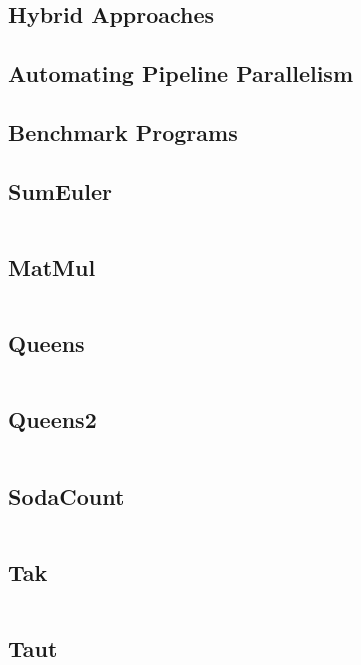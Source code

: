 \documentclass[openright, dottedtoc, headinclude, footinclude=true, a4paper, numbers=noenddot]{scrreprt}
\begin{document}
        \section{Hybrid Approaches}
        \label{sec:hybrid}
        
    
        \section{Automating Pipeline Parallelism}
        \label{sec:autoPipe}
        
    
    

\begin{appendices}

\chapter{Benchmark Programs}

    \section{SumEuler}
    \inputminted{haskell}{benchmarks/SumEuler.hs}
    \clearpage

    \section{MatMul}
    \inputminted{haskell}{benchmarks/MatMul.hs}
    \clearpage

    \section{Queens}
    \inputminted{haskell}{benchmarks/Queens.hs}
    \clearpage

    \section{Queens2}
    \inputminted{haskell}{benchmarks/Queens2.hs}
    \clearpage

    \section{SodaCount}
    \inputminted{haskell}{benchmarks/SodaCount.hs}
    \clearpage

    \section{Tak}
    \inputminted{haskell}{benchmarks/tak.hs}
    \clearpage

    \section{Taut}
    \inputminted{haskell}{benchmarks/Taut.hs}
    \clearpage

\end{appendices}

\listoftodos[Notes]

\if@openright
  \cleardoublepage
\else
  \clearpage
\fi



\end{document}
